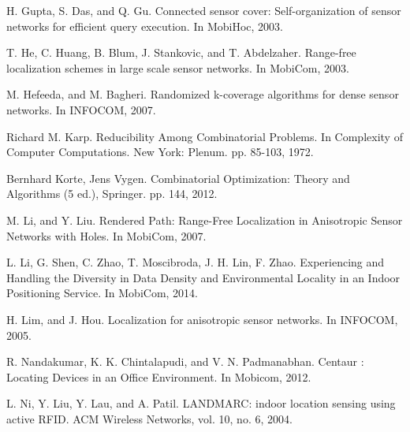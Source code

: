 \documentclass[10pt, conference, letterpaper]{IEEEtran}
\begin{document}
\begin{thebibliography}{99}
H. Gupta, S. Das, and Q. Gu. Connected sensor cover: Self-organization of sensor networks for efficient query execution. In MobiHoc, 2003.

\vspace{-0.35ex}

T. He, C. Huang, B. Blum, J. Stankovic, and T. Abdelzaher. Range-free localization schemes in large scale sensor networks. In MobiCom, 2003.

\vspace{-0.35ex}

M. Hefeeda, and M. Bagheri. Randomized k-coverage algorithms for dense sensor networks. In INFOCOM, 2007.

\vspace{-0.35ex}

Richard M. Karp. Reducibility Among Combinatorial Problems. In Complexity of Computer Computations. New York: Plenum. pp. 85-103, 1972.

\vspace{-0.35ex}

Bernhard Korte, Jens Vygen. Combinatorial Optimization: Theory and Algorithms (5 ed.), Springer. pp. 144, 2012.

\vspace{-0.35ex}

M. Li, and Y. Liu. Rendered Path: Range-Free Localization in Anisotropic Sensor Networks with Holes. In MobiCom, 2007.

\vspace{-0.35ex}

L. Li, G. Shen, C. Zhao, T. Moscibroda, J. H. Lin, F. Zhao. Experiencing and Handling the Diversity in Data Density and Environmental Locality in an Indoor Positioning Service. In MobiCom, 2014.

\vspace{-0.35ex}

H. Lim, and J. Hou. Localization for anisotropic sensor networks. In INFOCOM, 2005.

\vspace{-0.35ex}

R. Nandakumar, K. K. Chintalapudi, and V. N.
Padmanabhan. Centaur : Locating Devices in an Office Environment. In Mobicom, 2012.

\vspace{-0.35ex}

L. Ni, Y. Liu, Y. Lau, and A. Patil. LANDMARC: indoor location sensing using active RFID. ACM Wireless Networks, vol. 10, no. 6, 2004.


\end{thebibliography}
\end{document}
